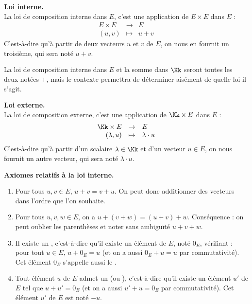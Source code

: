\documentclass[class=report,crop=false]{standalone}
\begin{document}
\textbf{Loi interne.} \\
La loi de composition interne dans $E$, c'est une application de $E \times E$ dans $E$ :
$$\begin{array}{rcl}
E \times E & \to & E\\
(u, v) & \mapsto & u+v
\end{array}$$
C'est-à-dire qu'à partir de deux vecteurs $u$ et $v$ de $E$,
on nous en fournit un troisième, qui sera noté $u+v$.

La loi de composition interne dans $E$ et la somme dans $\Kk$
seront toutes les deux notées $+$, mais le contexte permettra de déterminer
aisément de quelle loi il s'agit.


\bigskip
\textbf{Loi externe.} \\
La loi de composition externe,
 c'est une application de $\Kk \times E$ dans $E$ :
$$\begin{array}{rcl}
\Kk \times E & \to & E\\
(\lambda, u ) & \mapsto & \lambda \cdot u
\end{array}$$
C'est-à-dire qu'à partir d'un scalaire $\lambda \in \Kk$ et d'un vecteur $u \in E$, on nous
fournit un autre vecteur, qui sera noté $\lambda\cdot u$.


\bigskip
\textbf{Axiomes relatifs à la loi interne.}

 \begin{enumerate}
 \item {} Pour tous $u,v \in E$, $u + v = v + u$.
 On peut donc additionner des vecteurs dans l'ordre que l'on souhaite.

 \item {} Pour tous $u,v,w \in E$, on a $u + (v+w) = (u+v) +w$.
 Conséquence : on peut \og oublier \fg{} les parenthèses et noter sans ambiguïté $u+v+w$.

 \item Il existe un , c'est-à-dire qu'il existe un élément de $E$,
noté $0_{E}$, vérifiant : pour tout $u \in E$, $u+0_{E}=u$
(et on a aussi $0_E+u=u$ par commutativité). Cet élément $0_E$ s'appelle aussi le
.


 \item Tout élément $u$ de $E$ admet un 
 (ou ),
 c'est-à-dire qu'il existe un élément $u'$ de $E$ tel que
$u+u'=0_E$  (et on a aussi $u'+u=0_E$ par commutativité).
Cet élément $u'$ de $E$ est noté $-u$.

 \end{enumerate}
\end{document}
